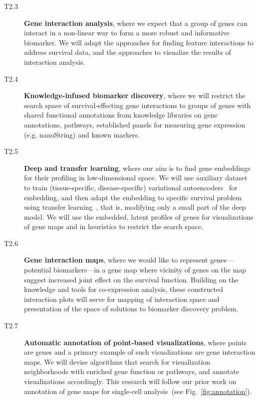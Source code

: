 \documentclass[11pt,a4paper]{article}
\renewcommand{\bold}{\textbf}
\begin{document}
\begin{description}
\begin{description}
		\item[T2.3] \bold{Gene interaction analysis}, where we expect that a group of genes can interact in a non-linear way to form a more robust and informative biomarker. We will adapt the approaches for finding feature interactions to address survival data, and the approaches to visualize the results of interaction analysis.
		\item[T2.4] \bold{Knowledge-infused biomarker discovery}, where we will restrict the search space of survival-effecting gene interactions to groups of genes with shared functional annotations from knowledge libraries on gene annotations, pathways, established panels for measuring gene expression (e.g. nanoString) and known markers.
 		\item[T2.5] \bold{Deep and transfer learning}, where our aim is to find gene embeddings for their profiling in low-dimensional space. We will use auxiliary dataset to train (tissue-specific, disease-specific) variational autoencoders~\cite{doersch2021tutorial} for embedding, and then adapt the embedding to specific survival problem using transfer learning~\cite{Godec2019}, that is, modifying only a small part of the deep model. We will use the embedded, latent profiles of genes for visualizations of gene maps and in heuristics to restrict the search space.
 		\item[T2.6] \bold{Gene interaction maps}, where we would like to represent genes---potential biomarkers---in a gene map where vicinity of genes on the map suggest increased joint effect on the survival function. Building on the knowledge and tools for co-expression analysis, these constructed interaction plots will serve for mapping of interaction space and presentation of the space of solutions to biomarker discovery problem.
		\item[T2.7] \bold{Automatic annotation of point-based visualizations}, where points are genes and a primary example of such visualizations are gene interaction maps. We will devise algorithms that search for visualization neighborhoods with enriched gene function or pathways, and annotate visualizations accordingly. This research will follow our prior work on annotation of gene maps for single-cell analysis~(see Fig.~\ref{fig:annotation}).
	\end{description}

\end{description}
\end{document}
